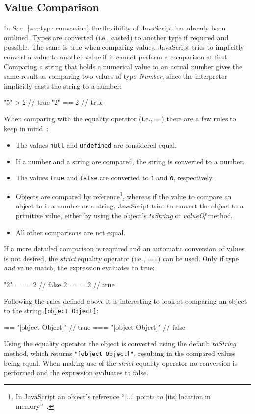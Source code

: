 \subsection{Value Comparison}
\label{sec:value-comparison}

In Sec.~\ref{sec:type-conversion} the flexibility of JavaScript has already been outlined. Types are converted (i.e., casted) to another type if required and possible.  The same is true when comparing values. JavaScript tries to implicitly convert a value to another value if it cannot perform a comparison at first. Comparing a string that holds a numerical value to an actual number gives the same result as comparing two values of type \emph{Number}, since the interpreter implicitly casts the string to a number:
\begin{JsCode}[numbers=none]
"5" > 2 // true
"2" == 2 // true
\end{JsCode}
When comparing with the equality operator (i.e., \texttt{==}) there are a few rules to keep in mind~\cite[p.~72]{JavaScriptTheDefinitiveGuide:Flanagan:2011}:
\begin{itemize}
  \item The values \texttt{null} and \texttt{undefined} are considered equal.
  \item If a number and a string are compared, the string is converted to a number.
  \item The values \texttt{true} and \texttt{false} are converted to \texttt{1} and \texttt{0}, respectively.
  \item Objects are compared by reference\footnote{In JavaScript an object's reference ``[...] points to [its] location in memory''~\cite{ByValueByReference:Aggarwal:2017}.}, whereas if the value to compare an object to is a number or a string, JavaScript tries to convert the object to a primitive value, either by using the object's \emph{toString} or \emph{valueOf} method.
  \item All other comparisons are not equal.
\end{itemize}
If a more detailed comparison is required and an automatic conversion of values is not desired, the \emph{strict} equality operator (i.e., \texttt{===}) can be used. Only if type \emph{and} value match, the expression evaluates to true:
\begin{JsCode}[numbers=none]
"2" === 2 // false
2 === 2   // true
\end{JsCode}
Following the rules defined above it is interesting to look at comparing an object to the string \texttt{[object Object]}:
\begin{JsCode}[numbers=none]
{} == "[object Object]"  // true
{} === "[object Object]" // false
\end{JsCode}
Using the equality operator the object is converted using the default \emph{toString} method, which returns \texttt{"[object Object]"}, resulting in the compared values being equal. When making use of the \emph{strict} equality operator no conversion is performed and the expression evaluates to false.

